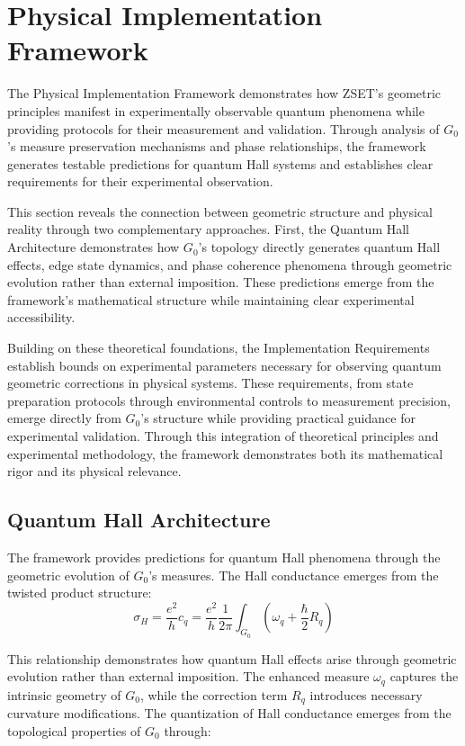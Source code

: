\documentclass[10pt]{article}
\begin{document}
\section{Physical Implementation Framework}

The Physical Implementation Framework demonstrates how ZSET's geometric principles manifest in experimentally observable quantum phenomena while providing protocols for their measurement and validation. Through analysis of $G_0$'s measure preservation mechanisms and phase relationships, the framework generates testable predictions for quantum Hall systems and establishes clear requirements for their experimental observation.

This section reveals the connection between geometric structure and physical reality through two complementary approaches. First, the Quantum Hall Architecture demonstrates how $G_0$'s topology directly generates quantum Hall effects, edge state dynamics, and phase coherence phenomena through geometric evolution rather than external imposition. These predictions emerge from the framework's mathematical structure while maintaining clear experimental accessibility.

Building on these theoretical foundations, the Implementation Requirements establish bounds on experimental parameters necessary for observing quantum geometric corrections in physical systems. These requirements, from state preparation protocols through environmental controls to measurement precision, emerge directly from $G_0$'s structure while providing practical guidance for experimental validation. Through this integration of theoretical principles and experimental methodology, the framework demonstrates both its mathematical rigor and its physical relevance.

\subsection{Quantum Hall Architecture}

The framework provides predictions for quantum Hall phenomena through the geometric evolution of $G_0$'s measures. The Hall conductance emerges from the twisted product structure:
\[
\sigma_H = \frac{e^2}{h} c_q = \frac{e^2}{h} \frac{1}{2\pi} \int_{G_0} \left(\omega_q + \frac{\hbar}{2}R_q\right)
\]

This relationship demonstrates how quantum Hall effects arise through geometric evolution rather than external imposition. The enhanced measure $\omega_q$ captures the intrinsic geometry of $G_0$, while the correction term $R_q$ introduces necessary curvature modifications. The quantization of Hall conductance emerges from the topological properties of $G_0$ through:
\end{document}
